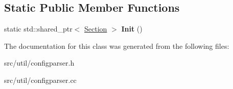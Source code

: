 \subsection*{Static Public Member Functions}
\begin{DoxyCompactItemize}
\item 
static std\+::shared\+\_\+ptr$<$ \hyperlink{classlog2hdfs_1_1Section}{Section} $>$ {\bfseries Init} ()\hypertarget{classlog2hdfs_1_1Section_ab0f923bf39efe934df970f2ca72ab65a}{}\label{classlog2hdfs_1_1Section_ab0f923bf39efe934df970f2ca72ab65a}

\end{DoxyCompactItemize}


The documentation for this class was generated from the following files\+:\begin{DoxyCompactItemize}
\item 
src/util/configparser.\+h\item 
src/util/configparser.\+cc\end{DoxyCompactItemize}
